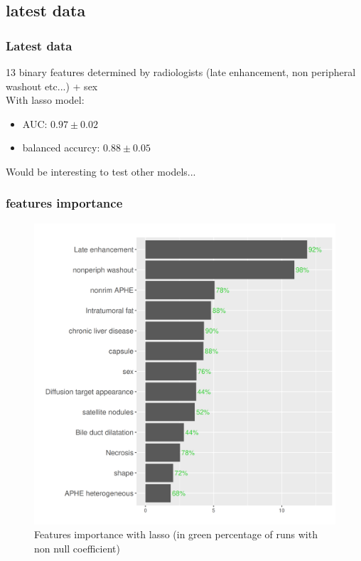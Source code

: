 \documentclass{beamer}
\begin{document}
\subsection{latest data}

\begin{frame}
    \frametitle{Latest data}
    13 binary features determined by radiologists (late enhancement, non peripheral washout etc...) + sex\\[10 pt]
    With lasso model:
    \begin{itemize}
        \item AUC: $0.97 \pm 0.02$\\[10 pt]
        \item balanced accurcy: $0.88 \pm 0.05$
        \end{itemize}
    Would be interesting to test other models...
\end{frame}

\begin{frame}
    \frametitle{features importance}
    \begin{figure}
        \centering
        \includegraphics[scale = 0.38]{images/barplot_final.png}
        \caption{Features importance with lasso (in green percentage of runs with non null coefficient)}
    \end{figure}
\end{frame}
\end{document}
